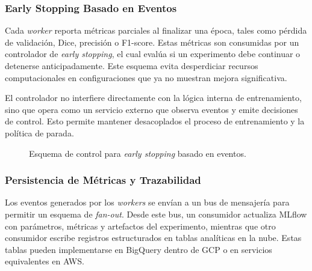 \documentclass[conference]{IEEEtran}
\begin{document}
\subsubsection{Early Stopping Basado en Eventos}

Cada \emph{worker} reporta métricas parciales al finalizar una época, tales como pérdida de validación, Dice, precisión o F1-score. Estas métricas son consumidas por un controlador de \emph{early stopping}, el cual evalúa si un experimento debe continuar o detenerse anticipadamente. Este esquema evita desperdiciar recursos computacionales en configuraciones que ya no muestran mejora significativa.

El controlador no interfiere directamente con la lógica interna de entrenamiento, sino que opera como un servicio externo que observa eventos y emite decisiones de control. Esto permite mantener desacoplados el proceso de entrenamiento y la política de parada.

\begin{figure}[!t]
\centering
{}
\caption{Esquema de control para \emph{early stopping} basado en eventos.}
\label{fig:early_stopping}
\end{figure}

\subsubsection{Persistencia de Métricas y Trazabilidad}

Los eventos generados por los \emph{workers} se envían a un bus de mensajería para permitir un esquema de \emph{fan-out}. Desde este bus, un consumidor actualiza MLflow con parámetros, métricas y artefactos del experimento, mientras que otro consumidor escribe registros estructurados en tablas analíticas en la nube. Estas tablas pueden implementarse en BigQuery dentro de GCP o en servicios equivalentes en AWS.
\end{document}

